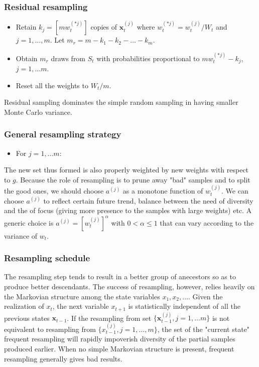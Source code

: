 \documentclass[times, utf8, diplomski]{fer}
\begin{document}
\subsubsection{Residual resampling}
\begin{itemize}
\item{Retain $k_j = [mw_t^{(*j)}]$ copies of $\mathbf{x}_t^{(j)}$ where $w_t^{(*j)} = w_t^{(j)} / W_t$ and $j = 1, \ldots, m$. Let $m_r = m - k_1 - k_2 - \ldots - k_m$.}
\item{Obtain $m_r$ draws from $S_t$ with probabilities proportional to $mw_t^{(*j)} - k_j$, $j = 1, \ldots m$.}
\item{Reset all the weights to $W_t / m$.}
\end{itemize}

Residual sampling dominates the simple random sampling in having smaller Monte Carlo variance. 

\subsubsection{General resampling strategy}
\begin{itemize}
\item{For $j = 1, \ldots m$:
}
\end{itemize}
The new set thus formed is also properly weighted by new weights with respect to $g$. Because the role of resampling is to prune away "bad" samples and to split the good ones, we should choose $a^{(j)}$ as a monotone function of $w_t^{(j)}$. We can choose $a^{(j)}$ to reflect certain future trend, balance between the need of diversity and the of focus (giving more presence to the samples with large weights) etc.  A generic choice is $a^{(j)} = [w_t^{(j)}]^{\alpha}$ with $0 < \alpha \leq 1$ that can vary according to the variance of $w_t$.

\vspace{10mm}

\subsubsection{Resampling schedule}
The resampling step tends to result in a better group of anecestors so  as to produce better descendants. The success of resampling, however, relies heavily on the Markovian structure among the state variables $x_1, x_2, \ldots$. Given the realization of $x_t$, the next variable $x_{t + 1}$ is statistically independent of all the previous states $\mathbf{x}_{t - 1}$. If the resampling from set $\{ \mathbf{x}_{t - 1}^{(j)}, j = 1, \ldots m\}$ is not equivalent to resampling from $\{ x_{t - 1}^{(j)}, j = 1, \ldots, m\}$, the set of the "current state" frequent resampling will rapidly impoverish diversity of the partial samples produced earlier. When no simple Markovian structure is present, frequent resampling generally gives bad results.
\end{document}
